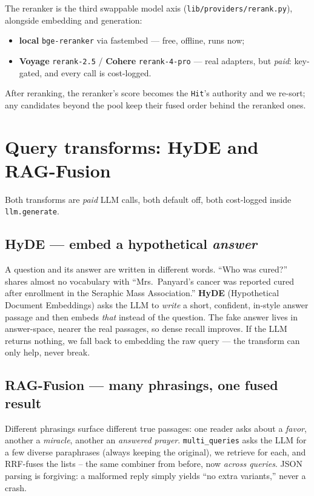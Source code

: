 \documentclass[11pt]{article}
\newcommand{\code}[1]{\texttt{#1}}
\newcommand{\file}[1]{\texttt{#1}}
\begin{document}
The reranker is the third swappable model axis (\file{lib/providers/rerank.py}), alongside embedding
and generation:
\begin{itemize}[leftmargin=*]
  \item \textbf{local} \code{bge-reranker} via fastembed --- free, offline, runs now;
  \item \textbf{Voyage} \code{rerank-2.5} / \textbf{Cohere} \code{rerank-4-pro} --- real adapters,
        but \emph{paid}: key-gated, and every call is cost-logged.
\end{itemize}
After reranking, the reranker's score becomes the \code{Hit}'s authority and we re-sort; any
candidates beyond the pool keep their fused order behind the reranked ones.

\section{Query transforms: HyDE and RAG-Fusion}
\label{sec:transforms}

Both transforms are \emph{paid} LLM calls, both default off, both cost-logged inside
\code{llm.generate}.

\subsection{HyDE --- embed a hypothetical \emph{answer}}

A question and its answer are written in different words. ``Who was cured?'' shares almost no
vocabulary with ``Mrs.\ Panyard's cancer was reported cured after enrollment in the Seraphic Mass
Association.'' \textbf{HyDE} (Hypothetical Document Embeddings) asks the LLM to \emph{write} a short,
confident, in-style answer passage and then embeds \emph{that} instead of the question. The fake
answer lives in answer-space, nearer the real passages, so dense recall improves. If the LLM returns
nothing, we fall back to embedding the raw query --- the transform can only help, never break.

\subsection{RAG-Fusion --- many phrasings, one fused result}

Different phrasings surface different true passages: one reader asks about a \emph{favor}, another a
\emph{miracle}, another an \emph{answered prayer}. \code{multi\_queries} asks the LLM for a few
diverse paraphrases (always keeping the original), we retrieve for each, and RRF-fuses the lists --
the same combiner from before, now \emph{across queries}. JSON parsing is forgiving: a malformed
reply simply yields ``no extra variants,'' never a crash.
\end{document}
